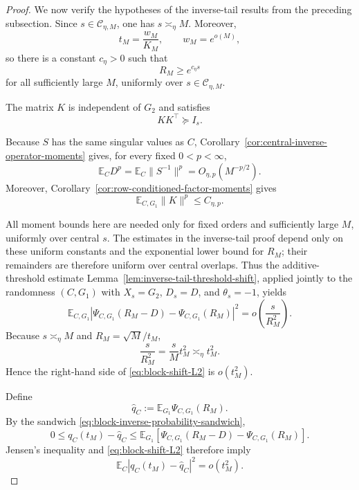 \documentclass[10pt,a4paper]{amsart}
\newcommand{\Ebb}{\mathbb E}
\theoremstyle{plain}
\begin{document}
\begin{proof}
We now verify the hypotheses of the inverse-tail results from the preceding subsection.
Since \(s\in\mathcal C_{\eta,M}\), one has \(s\asymp_\eta M\).  Moreover,
\[
        t_M=\frac{w_M}{K_M},
        \qquad
        w_M=e^{o(M)},
\]
so there is a constant \(c_\eta>0\) such that
\[
        R_M\ge e^{c_\eta s}
\]
for all sufficiently large \(M\), uniformly over
\(s\in\mathcal C_{\eta,M}\).

The matrix \(K\) is independent of \(G_2\) and satisfies
\[
        KK^\top\succeq I_s.
\]

Because \(S\) has the same singular values as \(C\),
Corollary~\ref{cor:central-inverse-operator-moments} gives, for every fixed
\(0<p<\infty\),
\begin{equation}
        \Ebb_C D^p
        =
        \Ebb_C\|S^{-1}\|^p
        =
        O_{\eta,p}(M^{-p/2}).
        \label{eq:D-central-moments}
\end{equation}
Moreover, Corollary~\ref{cor:row-conditioned-factor-moments} gives
\begin{equation}
        \Ebb_{C,G_1}\|K\|^p
        \le
        C_{\eta,p}.
        \label{eq:K-central-moments}
\end{equation}

All moment bounds here are needed only for fixed orders and sufficiently
large \(M\), uniformly over central \(s\). The estimates in the inverse-tail
proof depend only on these uniform constants and the exponential lower bound
for \(R_M\); their remainders are therefore uniform over central overlaps.
Thus the additive-threshold estimate
Lemma~\ref{lem:inverse-tail-threshold-shift}, applied jointly to the randomness
\((C,G_1)\) with \(X_s=G_2\), \(D_s=D\), and \(\theta_s=-1\), yields
\begin{equation}
        \Ebb_{C,G_1}
        \left|
        \Psi_{C,G_1}(R_M-D)
        -
        \Psi_{C,G_1}(R_M)
        \right|^2
        =
        o\left(\frac{s}{R_M^2}\right).
        \label{eq:block-shift-L2}
\end{equation}
Because \(s\asymp_\eta M\) and \(R_M=\sqrt M/t_M\),
\[
        \frac{s}{R_M^2}
        =
        \frac{s}{M}t_M^2
        \asymp_\eta t_M^2.
\]
Hence the right-hand side of \eqref{eq:block-shift-L2} is \(o(t_M^2)\).

Define
\[
        \widehat q_C
        :=
        \Ebb_{G_1}\Psi_{C,G_1}(R_M).
\]
By the sandwich \eqref{eq:block-inverse-probability-sandwich},
\[
        0
        \le
        q_C(t_M)-\widehat q_C
        \le
        \Ebb_{G_1}
        \left[
        \Psi_{C,G_1}(R_M-D)
        -
        \Psi_{C,G_1}(R_M)
        \right].
\]
Jensen's inequality and \eqref{eq:block-shift-L2} therefore imply
\begin{equation}
        \Ebb_C
        |q_C(t_M)-\widehat q_C|^2
        =
        o(t_M^2).
        \label{eq:qC-block-reduction-error}
\end{equation}


\end{proof}
\end{document}
